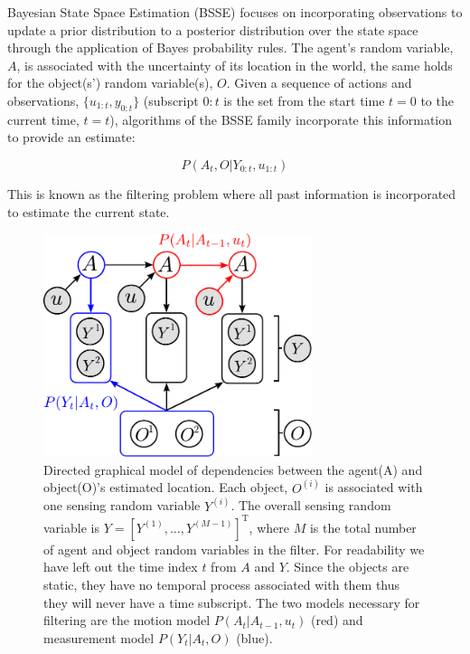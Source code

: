 Bayesian State Space Estimation (BSSE) focuses on incorporating observations to update a prior distribution to a posterior distribution 
over the state space through the application of Bayes probability rules. The agent's random variable, $A$, 
is associated with the uncertainty of its location in the world, the same holds for the object(s') random variable(s), $O$. 
Given a sequence of actions and observations, $\{u_{1:t},y_{0:t}\}$ (subscript $0:t$ is the set from the start time $t=0$ to the current time, $t=t$), 
algorithms of the BSSE family incorporate this information to provide an estimate:

\begin{equation}
 P(A_t,O|Y_{0:t},u_{1:t}) 
 \label{eq:joint}
\end{equation}

This is known as the filtering problem where all past information is incorporated to estimate the current state.  

\begin{figure}
\centering
\includegraphics[width=0.7\textwidth]{./ch5-MLMF/Figures/Figure2.pdf}
\caption{Directed graphical model of dependencies between the agent(A) and object(O)'s estimated location. Each 
object, $O^{(i)}$ is associated with one sensing random variable $Y^{(i)}$. The overall sensing random variable is $Y = \left[Y^{(1)},\dots,Y^{(M-1)}\right]^{\mathrm{T}}$,
where $M$ is the total number of agent and object random variables in the filter. 
For readability we have left out the time index $t$ from $A$ and $Y$. Since the objects are static, they have no temporal process associated with 
them thus they will never have a time subscript. The two models necessary for filtering are the motion model $P(A_t|A_{t-1},u_t)$ (red) and measurement model
$P(Y_t|A_t,O)$ (blue).}
\label{fig:bayesian_sse_dag}
\end{figure}

